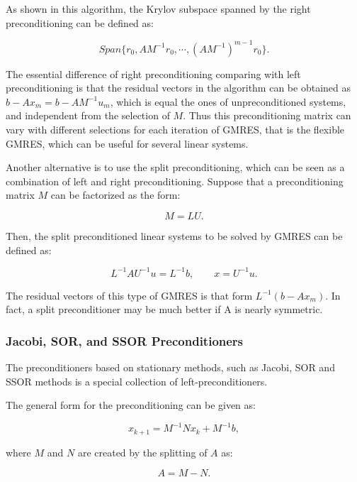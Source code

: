 As shown in this algorithm, the Krylov subspace spanned by the right preconditioning can be defined as:

\begin{equation}
Span\{r_0, AM^{-1}r_0, \cdots, (AM^{-1})^{m-1}r_0\}.
\end{equation}

The essential difference of right preconditioning comparing with left preconditioning is that the residual vectors in the algorithm can be obtained as $b-Ax_m=b-AM^{-1}u_m$, which is equal the ones of unpreconditioned systems, and independent from the selection of $M$. Thus this preconditioning matrix can vary with different selections for each iteration of GMRES, that is the flexible GMRES, which can be useful for several linear systems.

Another alternative is to use the split preconditioning, which can be seen as a combination of left and right preconditioning. Suppose that a preconditioning matrix $M$ can be factorized as the form:

\begin{equation}
M=LU.
\end{equation}

Then, the split preconditioned linear systems to be solved by GMRES can be defined as:

\begin{equation}
L^{-1}AU^{-1}u=L^{-1}b, \qquad x= U^{-1}u.
\end{equation}

The residual vectors of this type of GMRES is that form $L^{-1}(b-Ax_m)$. In fact, a split preconditioner may be much better if A is nearly symmetric. 

\subsubsection{Jacobi, SOR, and SSOR Preconditioners}

The preconditioners based on stationary methods, such as Jacobi, SOR and SSOR methods is a special collection of left-preconditioners.

The general form for the preconditioning can be given as:

\begin{equation}
x_{k+1} = M^{-1}Nx_k+M^{-1}b,
\end{equation}

where $M$ and $N$ are created by the splitting of $A$ as:

\begin{equation}
A=M-N.
\end{equation}

